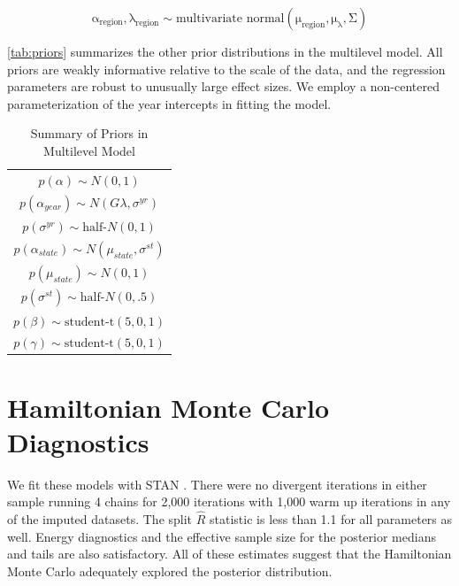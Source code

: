 \documentclass[12pt]{article}
\begin{document}
\begin{equation}
\mathrm{\alpha_{region}, \lambda_{region} \sim \mbox{multivariate normal}(\mu_{region}, \mu_{\lambda}, \Sigma)}
\end{equation}
 

\autoref{tab:priors} summarizes the other prior distributions in the multilevel model. 
All priors are weakly informative relative to the scale of the data, and the regression parameters are robust to unusually large effect sizes. 
We employ a non-centered parameterization of the year intercepts in fitting the model. 



\begin{table} %
\begin{center}
\begin{tabular}{c} 
$ p(\alpha) \sim N(0, 1)$  \\
$ p(\alpha_{year}) \sim N(G \lambda, \sigma^{yr}) $ \\ 
$ p(\sigma^{yr}) \sim \mbox{half-}N(0, 1) $ \\
$ p(\alpha_{state}) \sim N(\mu_{state}, \sigma^{st}) $ \\ 
$ p(\mu_{state}) \sim N(0, 1) $ \\ 
$ p(\sigma^{st}) \sim \mbox{half-}N(0, .5) $ \\ 
$ p(\beta) \sim \mbox{student-t}(5, 0, 1) $ \\
$ p(\gamma) \sim \mbox{student-t}(5, 0, 1) $ 
\end{tabular} 
\caption{Summary of Priors in Multilevel Model} 
\label{tab:priors}
\end{center} 
\end{table} 





\section{Hamiltonian Monte Carlo Diagnostics}

We fit these models with STAN \citep{Carpenteretal2016}.
There were no divergent iterations in either sample running 4 chains for 2,000 iterations with 1,000 warm up iterations in any of the imputed datasets.  
The split $\hat{R}$ statistic is less than 1.1 for all parameters as well.
Energy diagnostics and the effective sample size for the posterior medians and tails are also satisfactory.  
All of these estimates suggest that the Hamiltonian Monte Carlo adequately explored the posterior distribution. 
\end{document}
